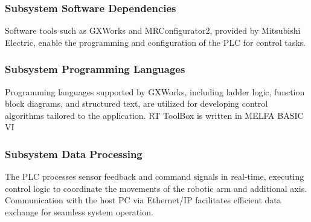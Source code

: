 \subsubsection{Subsystem Software Dependencies}
Software tools such as GXWorks and MRConfigurator2, provided by Mitsubishi Electric, enable the programming and configuration of the PLC for control tasks.


\subsubsection{Subsystem Programming Languages}
Programming languages supported by GXWorks, including ladder logic, function block diagrams, and structured text, are utilized for developing control algorithms tailored to the application. RT ToolBox is written in MELFA BASIC VI


\subsubsection{Subsystem Data Processing}
The PLC processes sensor feedback and command signals in real-time, executing control logic to coordinate the movements of the robotic arm and additional axis. Communication with the host PC via Ethernet/IP facilitates efficient data exchange for seamless system operation.









